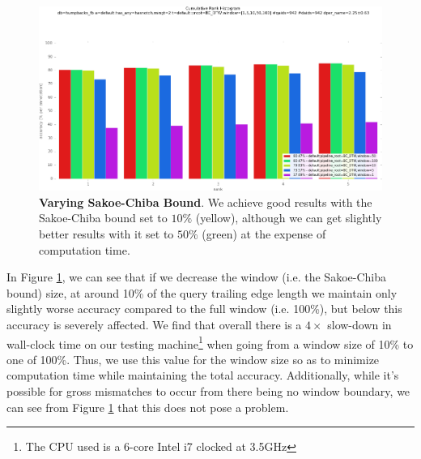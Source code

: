 
\begin{figure}[t]%
\centering
\includegraphics[width=1\textwidth]{../images/results/vary_window.png}
\caption{\textbf{Varying Sakoe-Chiba Bound}. We achieve good results with the Sakoe-Chiba bound set to $10\%$ (yellow), although we can get slightly better results with it set to $50\%$ (green) at the expense of computation time.}
\label{fig:vary_window}
\end{figure}



In Figure \ref{fig:vary_window}, we can see that if we decrease the window (i.e. the Sakoe-Chiba bound) size, at around 10\% of the query trailing edge length we maintain only slightly worse accuracy compared to the full window (i.e. 100\%), but below this accuracy is severely affected.
We find that overall there is a $4\times$ slow-down in wall-clock time on our testing machine\footnote{The CPU used is a 6-core Intel i7 clocked at 3.5GHz} when going from a window size of 10\% to one of 100\%. 
Thus, we use this value for the window size so as to minimize computation time while maintaining the total accuracy.
Additionally, while it's possible for gross mismatches to occur from there being no window boundary, we can see from Figure \ref{fig:vary_window} that this does not pose a problem.


